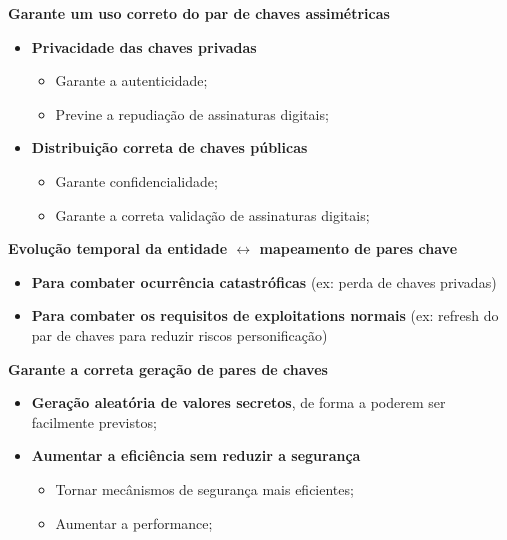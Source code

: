 \documentclass{article}
\begin{document}
\begin{flushleft}
  \textbf{Garante um uso correto do par de chaves assimétricas}

  \begin{itemize}
     
  

    \item \textbf{Privacidade das chaves privadas}
    \begin{itemize}
      \item Garante a autenticidade;
      \item Previne a repudiação de assinaturas digitais;
    \end{itemize}

    \item \textbf{Distribuição correta de chaves públicas}
    \begin{itemize}
      \item Garante confidencialidade;
      \item Garante a correta validação de assinaturas digitais;
    \end{itemize}

  \end{itemize}

  \vspace{2mm}

  \textbf{Evolução temporal da entidade $\longleftrightarrow$ mapeamento de pares chave}

  \begin{itemize}
  
    \item \textbf{Para combater ocurrência catastróficas} (ex: perda de chaves privadas)

    \item \textbf{Para combater os requisitos de exploitations normais}
    (ex: refresh do par de chaves para reduzir riscos personificação)

  \end{itemize}

  \vspace{2mm}

  \textbf{Garante a correta geração de pares de chaves}
  \begin{itemize}
    \item \textbf{Geração aleatória de valores secretos}, de forma a poderem ser facilmente previstos;
    \item \textbf{Aumentar a eficiência sem reduzir a segurança}
    \begin{itemize}
      \item Tornar mecânismos de segurança mais eficientes;
      \item Aumentar a performance;
    \end{itemize}
  \end{itemize}
\end{flushleft}
\end{document}
